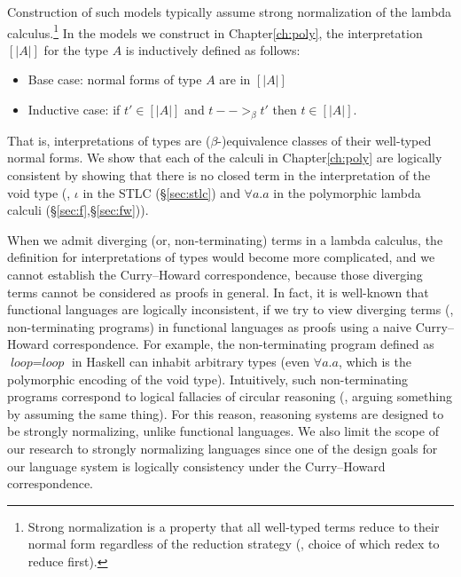 Construction of such models typically assume strong normalization of
the lambda calculus.\footnote{Strong normalization is a property that
all well-typed terms reduce to their normal form regardless of
the reduction strategy (\ie, choice of which redex to reduce first).}
In the models we construct in Chapter\;\ref{ch:poly},
the interpretation $[| A |]$ for the type $A$ is inductively defined as follows:
\begin{itemize}
        \item Base case: normal forms of type $A$ are in $[| A |]$
        \item Inductive case: if $t' \in [| A |]$ and $t -->_\beta t'$
                then $t \in [| A |]$.
\end{itemize}
That is, interpretations of types are ($\beta$-)equivalence classes of their
well-typed normal forms.
We show that each of the calculi in Chapter\;\ref{ch:poly} are
logically consistent by showing that there is no closed term
in the interpretation of the void type
(\ie, $\iota$ in the STLC (\S\ref{sec:stlc}) and $\forall a.a$ in
the polymorphic lambda calculi (\S\ref{sec:f},\S\ref{sec:fw})).

When we admit diverging (or, non-terminating) terms in a lambda calculus,
the definition for interpretations of types would become more complicated,
and we cannot establish the Curry--Howard correspondence, because those
diverging terms cannot be considered as proofs in general. In fact,
it is well-known that functional languages are logically inconsistent,
if we try to view diverging terms (\ie, non-terminating programs)
in functional languages as proofs using a naive Curry--Howard correspondence.
For example, the non-terminating program defined as
$\textit{loop} = \textit{loop}$ in Haskell can inhabit arbitrary types
(even $\forall a.a$, which is the polymorphic encoding of the void type).
Intuitively, such non-terminating programs correspond to logical fallacies of
circular reasoning (\ie, arguing something by assuming the same thing).
For this reason, reasoning systems are designed to be strongly normalizing,
unlike functional languages. We also limit the scope of our research to
strongly normalizing languages since one of the design goals for our language
system is logically consistency under the Curry--Howard correspondence.



